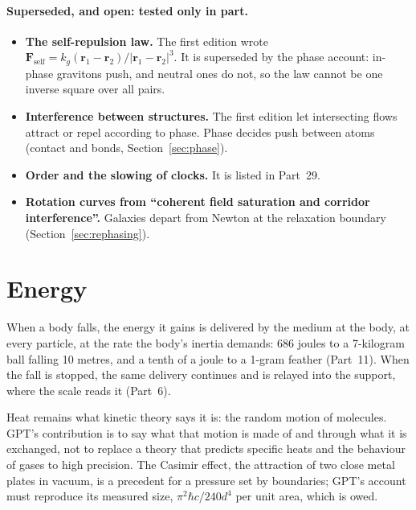 \documentclass[11pt,a4paper]{article}
\begin{document}
\paragraph{Superseded, and open: tested only in part.}
\begin{itemize}
\item \textbf{The self-repulsion law.} The first edition wrote $\mathbf{F}_{\text{self}} = k_g(\mathbf{r}_1-\mathbf{r}_2)/|\mathbf{r}_1-\mathbf{r}_2|^3$. It is superseded by the phase account: in-phase gravitons push, and neutral ones do not, so the law cannot be one inverse square over all pairs. 
\item \textbf{Interference between structures.} The first edition let intersecting flows attract or repel according to phase. Phase decides push between atoms (contact and bonds, Section~\ref{sec:phase}). 
\item \textbf{Order and the slowing of clocks.}  It is listed in Part~29.
\item \textbf{Rotation curves from ``coherent field saturation and corridor interference''.} Galaxies depart from Newton at the relaxation boundary (Section~\ref{sec:rephasing}). 
\end{itemize}

\section{Energy}
\label{sec:energy}

 When a body falls, the energy it gains is delivered by the medium at the body, at every particle, at the rate the body's inertia demands: 686 joules to a 7-kilogram ball falling 10 metres, and a tenth of a joule to a 1-gram feather (Part~11). When the fall is stopped, the same delivery continues and is relayed into the support, where the scale reads it (Part~6).

Heat remains what kinetic theory says it is: the random motion of molecules. GPT's contribution is to say what that motion is made of and through what it is exchanged, not to replace a theory that predicts specific heats and the behaviour of gases to high precision. The Casimir effect, the attraction of two close metal plates in vacuum, is a precedent for a pressure set by boundaries; GPT's account must reproduce its measured size, $\pi^2\hbar c/240d^4$ per unit area, which is owed.
\end{document}
